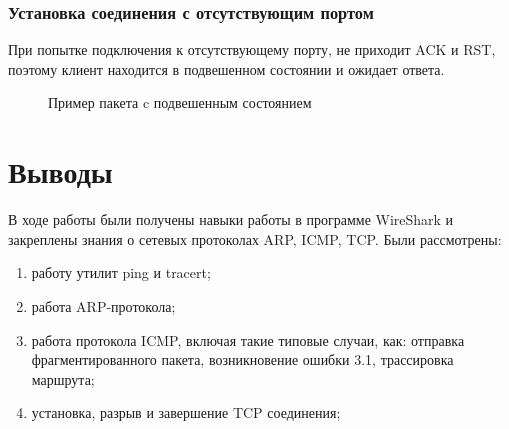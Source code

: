 \documentclass[a4paper, 14pt,russian]{article}
\begin{document}
	\subsubsection{Установка соединения с отсутствующим портом}
		При попытке подключения к отсутствующему порту, не приходит ACK и RST, поэтому клиент находится в подвешенном состоянии и ожидает ответа.
		\begin{figure}[h!]
			\caption{Пример пакета c подвешенным состоянием}
			\label{img:tcp_reset}
		\end{figure}


\section{Выводы}
В ходе работы были получены навыки работы в программе WireShark и закреплены знания о сетевых протоколах ARP, ICMP, TCP. 
Были рассмотрены: 
\begin{enumerate}
	\item работу утилит ping и tracert;
	\item работа ARP-протокола;
	\item работа протокола ICMP, включая такие типовые случаи, как: отправка фрагментированного пакета, возникновение ошибки 3.1,  трассировка маршрута;
	\item установка, разрыв и завершение TCP соединения;
\end{enumerate}

\end{document}

